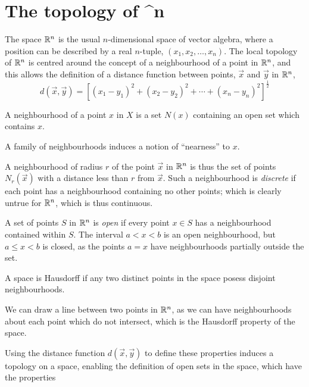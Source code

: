 \section{The topology of ^n}
\label{the-topology-of-rn}

The space \(\mathbb{R}^n\) is the usual \(n\)-dimensional space of vector
algebra, where a position can be described by a real \(n\)-tuple,
\((x_1, x_2,
\dots, x_n)\). The local topology of \(\mathbb{R}^n\) is centred around the
concept of a neighbourhood of a point in \(\mathbb{R}^n\), and this allows the
definition of a distance function between points, \(\vec{x}\) and
\(\vec{y}\) in \(\mathbb{R}^n\),
\begin{equation}
  \label{eq:1}
  d(\vec{x},\vec{y}) = \left[ (x_1 - y_1)^2 + (x_2 - y_2)^2 + \cdots + (x_n - y_n)^2 \right]^{\frac{1}{2}}
\end{equation}

\begin{definition}[Neighbourhood]
A neighbourhood of a point \(x\) in \(X\) is a set \(N(x)\) containing
an open set which contains \(x\).
\end{definition}

A family of neighbourhoods induces a notion of ``nearness'' to \(x\).

A neighbourhood of radius \(r\) of the point \(\vec{x}\) in \(\mathbb{R}^n\) is
thus the set of points \(N_r(\vec{x})\) with a distance less than \(r\)
from \(\vec{x}\). Such a neighbourhood is \emph{discrete} if each point
has a neighbourhood containing no other points; which is clearly untrue
for \(\mathbb{R}^n\), which is thus continuous.

A set of points \(S\) in \(\mathbb{R}^n\) is \emph{open} if every point
\(x \in S\) has a neighbourhood contained within \(S\). The interval
\(a<x<b\) is an open neighbourhood, but \(a \leq x < b\) is closed, as
the points \(a=x\) have neighbourhoods partially outside the set.

\begin{definition}
A space is Hausdorff if any two distinct points in
the space posess disjoint neighbourhoods.
\end{definition}

We can draw a line between two points in \(\mathbb{R}^n\), as we can have
neighbourhoods about each point which do not intersect, which is the
Hausdorff property of the space.

Using the distance function \(d(\vec{x}, \vec{y})\) to define these
properties induces a topology on a space, enabling the definition of
open sets in the space, which have the properties

